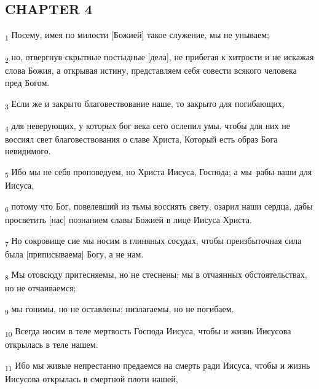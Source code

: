 \subsection{CHAPTER 4}
\begin{tcolorbox}
\textsubscript{1} Посему, имея по милости [Божией] такое служение, мы не унываем;
\end{tcolorbox}
\begin{tcolorbox}
\textsubscript{2} но, отвергнув скрытные постыдные [дела], не прибегая к хитрости и не искажая слова Божия, а открывая истину, представляем себя совести всякого человека пред Богом.
\end{tcolorbox}
\begin{tcolorbox}
\textsubscript{3} Если же и закрыто благовествование наше, то закрыто для погибающих,
\end{tcolorbox}
\begin{tcolorbox}
\textsubscript{4} для неверующих, у которых бог века сего ослепил умы, чтобы для них не воссиял свет благовествования о славе Христа, Который есть образ Бога невидимого.
\end{tcolorbox}
\begin{tcolorbox}
\textsubscript{5} Ибо мы не себя проповедуем, но Христа Иисуса, Господа; а мы--рабы ваши для Иисуса,
\end{tcolorbox}
\begin{tcolorbox}
\textsubscript{6} потому что Бог, повелевший из тьмы воссиять свету, озарил наши сердца, дабы просветить [нас] познанием славы Божией в лице Иисуса Христа.
\end{tcolorbox}
\begin{tcolorbox}
\textsubscript{7} Но сокровище сие мы носим в глиняных сосудах, чтобы преизбыточная сила была [приписываема] Богу, а не нам.
\end{tcolorbox}
\begin{tcolorbox}
\textsubscript{8} Мы отовсюду притесняемы, но не стеснены; мы в отчаянных обстоятельствах, но не отчаиваемся;
\end{tcolorbox}
\begin{tcolorbox}
\textsubscript{9} мы гонимы, но не оставлены; низлагаемы, но не погибаем.
\end{tcolorbox}
\begin{tcolorbox}
\textsubscript{10} Всегда носим в теле мертвость Господа Иисуса, чтобы и жизнь Иисусова открылась в теле нашем.
\end{tcolorbox}
\begin{tcolorbox}
\textsubscript{11} Ибо мы живые непрестанно предаемся на смерть ради Иисуса, чтобы и жизнь Иисусова открылась в смертной плоти нашей,
\end{tcolorbox}
